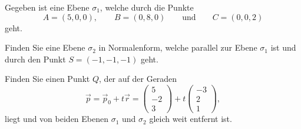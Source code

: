 Gegeben ist eine Ebene $\sigma_1$, welche durch die Punkte
\[
A=(5,0,0), \qquad
B=(0,8,0) \qquad \text{und}\qquad  
C=(0,0,2)
\]
geht.

\begin{teilaufgaben}
\item
Finden Sie eine Ebene $\sigma_2$ in Normalenform, welche parallel zur 
Ebene $\sigma_1$ ist und durch den Punkt $S=(-1,-1,-1)$ geht.
\item 
Finden Sie einen Punkt $Q$, der auf der Geraden
\begin{equation}
\vec{p}
=
\vec{p}_0 + t\vec{r}
=
\begin{pmatrix}5\\-2\\3\end{pmatrix}
+
t
\begin{pmatrix}-3\\2\\1\end{pmatrix},
\label{50000029:gerade}
\end{equation}
liegt und von beiden Ebenen $\sigma_1$ und $\sigma_2$ gleich weit entfernt ist.
\end{teilaufgaben}



